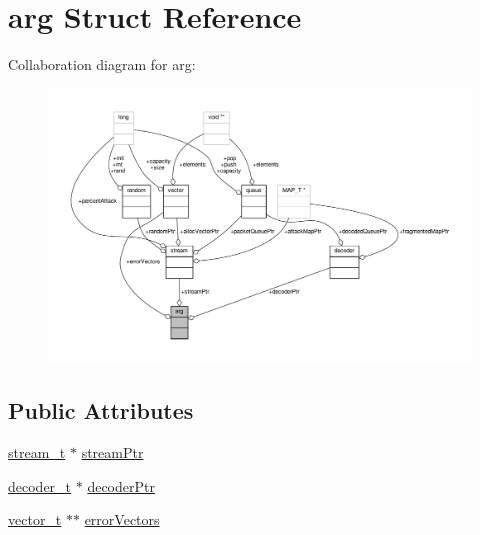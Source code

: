\hypertarget{structarg}{\section{arg Struct Reference}
\label{structarg}
}


Collaboration diagram for arg\-:
\nopagebreak
\begin{figure}[H]
\begin{center}
\leavevmode
\includegraphics[width=350pt]{structarg__coll__graph}
\end{center}
\end{figure}
\subsection*{Public Attributes}
\begin{DoxyCompactItemize}
\item 
\hyperlink{stream_8h_aa1f49f637a7bd758e258151ea80f58f7}{stream\-\_\-t} $\ast$ \hyperlink{structarg_ad3b633aa3fe0587991c98ee6598ca665}{stream\-Ptr}
\item 
\hyperlink{decoder_8h_adffea8c79b0574669a059a454fb9e923}{decoder\-\_\-t} $\ast$ \hyperlink{structarg_aa1c5e345d98f5457778fca28980da18d}{decoder\-Ptr}
\item 
\hyperlink{vector_8h_a5a1bca6fa9a3f18a2897623094d918da}{vector\-\_\-t} $\ast$$\ast$ \hyperlink{structarg_a272214d5c22ca222e8883e3dc7cd5001}{error\-Vectors}
\end{DoxyCompactItemize}



